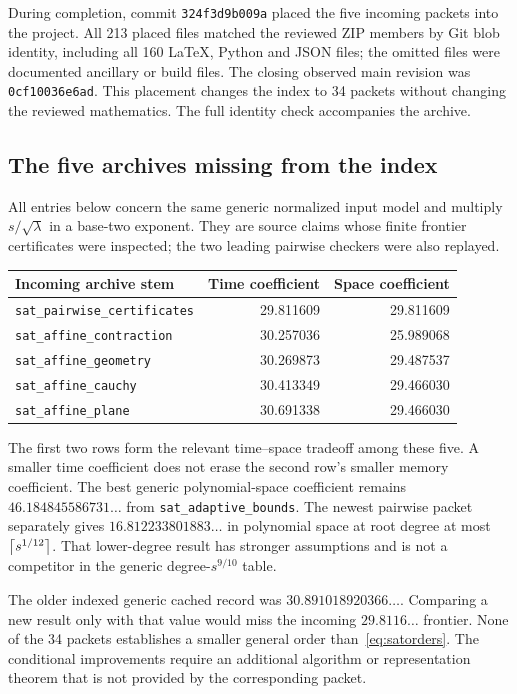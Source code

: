 During completion, commit \texttt{324f3d9b009a} placed the five incoming
packets into the project. All 213 placed files matched the reviewed ZIP
members by Git blob identity, including all 160 LaTeX, Python and JSON
files; the omitted files were documented ancillary or build files.
The closing observed main revision was \texttt{0cf10036e6ad}.
This placement changes the index to 34 packets without changing the
reviewed mathematics. The full identity check accompanies the archive.

\subsection{The five archives missing from the index}

All entries below concern the same generic normalized input model and
multiply $s/\sqrt\lambda$ in a base-two exponent. They are source claims
whose finite frontier certificates were inspected; the two leading
pairwise checkers were also replayed.

\begin{center}\small
\begin{tabular}{@{}p{6.1cm}rr@{}}
\toprule Incoming archive stem & Time coefficient & Space coefficient\\
\midrule
\texttt{sat\_pairwise\_certificates}&29.811609&29.811609\\
\texttt{sat\_affine\_contraction}&30.257036&25.989068\\
\texttt{sat\_affine\_geometry}&30.269873&29.487537\\
\texttt{sat\_affine\_cauchy}&30.413349&29.466030\\
\texttt{sat\_affine\_plane}&30.691338&29.466030\\
\bottomrule
\end{tabular}
\end{center}

The first two rows form the relevant time--space tradeoff among these
five. A smaller time coefficient does not erase the second row's smaller
memory coefficient. The best generic polynomial-space coefficient remains
$46.184845586731\ldots$ from \texttt{sat\_adaptive\_bounds}. The newest
pairwise packet separately gives $16.812233801883\ldots$ in polynomial
space at root degree at most $\left\lceil s^{1/12}\right\rceil$. That lower-degree result
has stronger assumptions and is not a competitor in the generic
degree-$s^{9/10}$ table.

The older indexed generic cached record was $30.891018920366\ldots$.
Comparing a new result only with that value would miss the incoming
$29.8116\ldots$ frontier. None of the 34 packets establishes a smaller
general order than~\eqref{eq:satorders}. The conditional improvements
require an additional algorithm or representation theorem that is not
provided by the corresponding packet.

